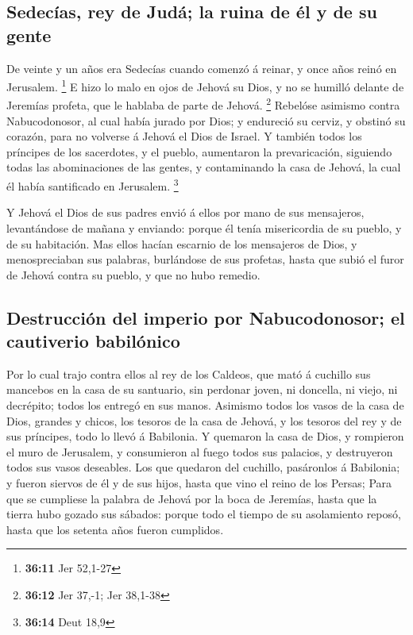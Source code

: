 \hypertarget{sedecuxedas-rey-de-juduxe1-la-ruina-de-uxe9l-y-de-su-gente}{%
\subsection{Sedecías, rey de Judá; la ruina de él y de su
gente}\label{sedecuxedas-rey-de-juduxe1-la-ruina-de-uxe9l-y-de-su-gente}}

 De veinte y un años era Sedecías cuando comenzó á reinar,
y once años reinó en Jerusalem. \footnote{\textbf{36:11} Jer 52,1-27}
 E hizo lo malo en ojos de Jehová su Dios, y no se humilló
delante de Jeremías profeta, que le hablaba de parte de Jehová.
\footnote{\textbf{36:12} Jer 37,-1; Jer 38,1-38}  Rebelóse
asimismo contra Nabucodonosor, al cual había jurado por Dios; y
endureció su cerviz, y obstinó su corazón, para no volverse á Jehová el
Dios de Israel.  Y también todos los príncipes de los
sacerdotes, y el pueblo, aumentaron la prevaricación, siguiendo todas
las abominaciones de las gentes, y contaminando la casa de Jehová, la
cual él había santificado en Jerusalem. \footnote{\textbf{36:14} Deut
  18,9}

 Y Jehová el Dios de sus padres envió á ellos por mano de
sus mensajeros, levantándose de mañana y enviando: porque él tenía
misericordia de su pueblo, y de su habitación.  Mas ellos
hacían escarnio de los mensajeros de Dios, y menospreciaban sus
palabras, burlándose de sus profetas, hasta que subió el furor de Jehová
contra su pueblo, y que no hubo remedio.

\hypertarget{destrucciuxf3n-del-imperio-por-nabucodonosor-el-cautiverio-babiluxf3nico}{%
\subsection{Destrucción del imperio por Nabucodonosor; el cautiverio
babilónico}\label{destrucciuxf3n-del-imperio-por-nabucodonosor-el-cautiverio-babiluxf3nico}}

 Por lo cual trajo contra ellos al rey de los Caldeos, que
mató á cuchillo sus mancebos en la casa de su santuario, sin perdonar
joven, ni doncella, ni viejo, ni decrépito; todos los entregó en sus
manos.  Asimismo todos los vasos de la casa de Dios,
grandes y chicos, los tesoros de la casa de Jehová, y los tesoros del
rey y de sus príncipes, todo lo llevó á Babilonia.  Y
quemaron la casa de Dios, y rompieron el muro de Jerusalem, y
consumieron al fuego todos sus palacios, y destruyeron todos sus vasos
deseables.  Los que quedaron del cuchillo, pasáronlos á
Babilonia; y fueron siervos de él y de sus hijos, hasta que vino el
reino de los Persas;  Para que se cumpliese la palabra de
Jehová por la boca de Jeremías, hasta que la tierra hubo gozado sus
sábados: porque todo el tiempo de su asolamiento reposó, hasta que los
setenta años fueron cumplidos.

